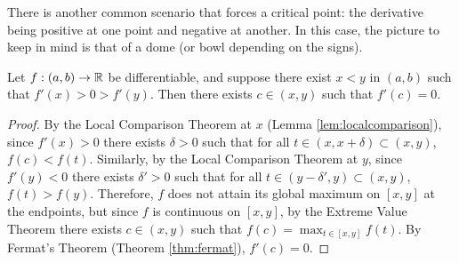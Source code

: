 \documentclass[../analysis1.tex]{subfiles}
\begin{document}
There is another common scenario that forces a critical point: the derivative being positive at one point and negative at another. In this case, the picture to keep in mind is that of a dome (or bowl depending on the signs).

\begin{theorem}
\label{thm:lemdarboux}
    \begin{shaded*}
        Let $f:(a,b)\to\mathbb{R}$ be differentiable, and suppose there exist $x<y$ in $(a,b)$ such that $f'(x)>0>f'(y)$. Then there exists $c\in(x,y)$ such that $f'(c)=0$.
    \end{shaded*}
\end{theorem}
\begin{proof}
    By the Local Comparison Theorem at $x$ (Lemma \ref{lem:localcomparison}), since $f'(x)>0$ there exists $\delta>0$ such that for all $t\in(x,x+\delta)\subset(x,y)$, $f(c)<f(t)$. Similarly, by the Local Comparison Theorem at $y$, since $f'(y)<0$ there exists $\delta'>0$ such that for all $t\in(y-\delta',y)\subset(x,y)$, $f(t)>f(y)$. Therefore, $f$ does not attain its global maximum on $[x,y]$ at the endpoints, but since $f$ is continuous on $[x,y]$, by the Extreme Value Theorem there exists $c\in(x,y)$ such that $f(c)=\max_{t\in[x,y]}f(t)$. By Fermat's Theorem (Theorem \ref{thm:fermat}), $f'(c)=0$.\qedhere
\end{proof}
\end{document}
